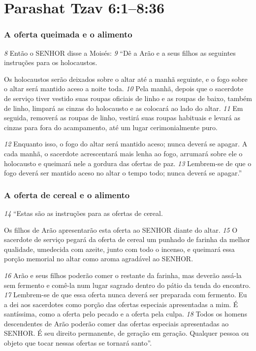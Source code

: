 \section*{Parashat Tzav 6:1–8:36}
\subsubsection*{A oferta queimada e o alimento}  
\textit{\tiny 8} 
Então o SENHOR disse a Moisés: 
\textit{\tiny 9} 
“Dê a Arão e a seus filhos as seguintes
instruções para os holocaustos. 

\smallskip
Os holocaustos serão deixados sobre o altar até a
manhã seguinte, e o fogo sobre o altar será mantido aceso a noite toda. 
\textit{\tiny 10}
Pela
manhã, depois que o sacerdote de serviço tiver vestido suas roupas oficiais de
linho e as roupas de baixo, também de linho, limpará as cinzas do holocausto e as
colocará ao lado do altar. 
\textit{\tiny 11}
Em seguida, removerá as roupas de linho, vestirá suas
roupas habituais e levará as cinzas para fora do acampamento, até um lugar
cerimonialmente puro. 

\smallskip
\textit{\tiny 12}
Enquanto isso, o fogo do altar será mantido aceso;
nunca deverá se apagar. A cada manhã, o sacerdote acrescentará mais lenha ao
fogo, arrumará sobre ele o holocausto e queimará nele a gordura das ofertas de
paz. 
\textit{\tiny 13}
Lembrem-se de que o fogo deverá ser mantido aceso no altar o tempo todo;
nunca deverá se apagar.”

\bigskip
\subsubsection*{A oferta de cereal e o alimento}  
\textit{\tiny 14}
“Estas são as instruções para as ofertas de cereal. 

\smallskip
Os filhos de Arão
apresentarão esta oferta ao SENHOR diante do altar. 
\textit{\tiny 15}
O sacerdote de serviço
pegará da oferta de cereal um punhado de farinha da melhor qualidade,
umedecida com azeite, junto com todo o incenso, e queimará essa porção
memorial no altar como aroma agradável ao SENHOR. 

\smallskip
\textit{\tiny 16}
Arão e seus filhos poderão
comer o restante da farinha, mas deverão assá-la sem fermento e comê-la num
lugar sagrado dentro do pátio da tenda do encontro. 
\textit{\tiny 17}
Lembrem-se de que essa
oferta nunca deverá ser preparada com fermento. Eu a dei aos sacerdotes como
porção das ofertas especiais apresentadas a mim. É santíssima, como a oferta pelo
pecado e a oferta pela culpa. 
\textit{\tiny 18}
Todos os homens descendentes de Arão poderão
comer das ofertas especiais apresentadas ao SENHOR. É seu direito permanente, de
geração em geração. Qualquer pessoa ou objeto que tocar nessas ofertas se
tornará santo”.

